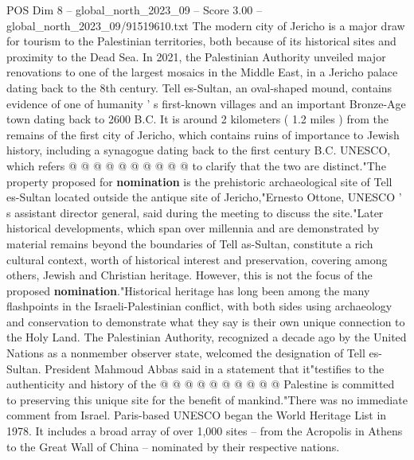 \begin{textsample}{POS Dim 8 – global\_north\_2023\_09 – Score 3.00 – global\_north\_2023\_09/91519610.txt}
The modern city of Jericho is a major draw for tourism to the Palestinian territories, both because of its historical sites and proximity to the Dead Sea.
In 2021, the Palestinian Authority unveiled major renovations to one of the largest mosaics in the Middle East, in a Jericho palace dating back to the 8th century.
Tell es-Sultan, an oval-shaped mound, contains evidence of one of humanity ' s first-known villages and an important Bronze-Age town dating back to 2600 B.C.
It is around 2 kilometers ( 1.2 miles ) from the remains of the first city of Jericho, which contains ruins of importance to Jewish history, including a synagogue dating back to the first century B.C.
UNESCO, which refers @ @ @ @ @ @ @ @ @ @ to clarify that the two are distinct."The property proposed for \textbf{nomination} is the prehistoric archaeological site of Tell es-Sultan located outside the antique site of Jericho,"Ernesto Ottone, UNESCO ' s assistant director general, said during the meeting to discuss the site."Later historical developments, which span over millennia and are demonstrated by material remains beyond the boundaries of Tell as-Sultan, constitute a rich cultural context, worth of historical interest and preservation, covering among others, Jewish and Christian heritage.
However, this is not the focus of the proposed \textbf{nomination}."Historical heritage has long been among the many flashpoints in the Israeli-Palestinian conflict, with both sides using archaeology and conservation to demonstrate what they say is their own unique connection to the Holy Land.
The Palestinian Authority, recognized a decade ago by the United Nations as a nonmember observer state, welcomed the designation of Tell es-Sultan.
President Mahmoud Abbas said in a statement that it"testifies to the authenticity and history of the @ @ @ @ @ @ @ @ @ @ Palestine is committed to preserving this unique site for the benefit of mankind."There was no immediate comment from Israel.
Paris-based UNESCO began the World Heritage List in 1978.
It includes a broad array of over 1,000 sites -- from the Acropolis in Athens to the Great Wall of China -- nominated by their respective nations.

\end{textsample}
